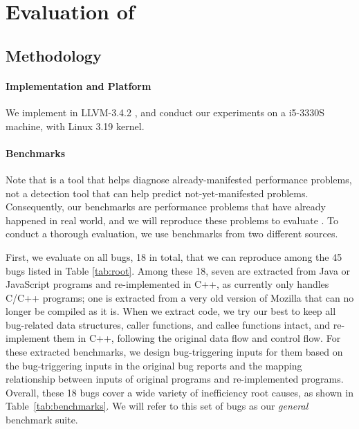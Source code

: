 \section{Evaluation of \Tool}
\label{sec:experiment}

\subsection{Methodology}
\label{sec:result_meth}



\paragraph{Implementation and Platform}
We implement \Tool in LLVM-3.4.2 \cite{llvm}, and conduct our
experiments on a i5-3330S machine, with Linux 3.19 kernel. 

\paragraph{Benchmarks}
Note that \Tool is a tool that helps diagnose already-manifested performance problems,
not a detection tool that can help predict not-yet-manifested
problems. Consequently, our benchmarks are performance problems that have already
happened in real world, and we will reproduce these problems to evaluate \Tool.
To conduct a thorough evaluation, we use
benchmarks from two different sources.

First, we evaluate \Tool on all bugs, 18 in total, that we can reproduce 
among the 45 bugs listed in Table \ref{tab:root}. 
Among these 18, seven are extracted from Java or JavaScript
programs and re-implemented in C++, as \Tool currently only handles C/C++
programs; one is extracted from a very old version of Mozilla that can no longer be
compiled as it is.
When we extract code, we try our best to keep all bug-related data structures,
caller functions, and callee functions intact, and re-implement them in C++, 
following the original data flow and control flow. For these extracted benchmarks, 
we design bug-triggering inputs for them based on the bug-triggering inputs in 
the original bug reports and the mapping relationship between inputs of original programs 
and re-implemented programs.
Overall, these 18 bugs cover a wide variety of inefficiency root causes, as 
shown in Table~\ref{tab:benchmarks}. 
We will refer to this set of bugs as our \emph{general} benchmark suite.

